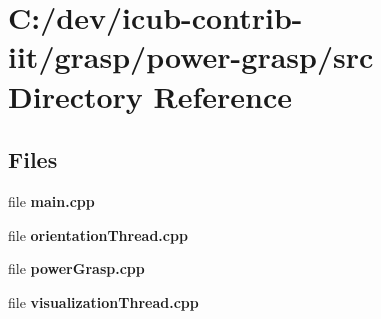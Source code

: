 \section{C\+:/dev/icub-\/contrib-\/iit/grasp/power-\/grasp/src Directory Reference}
\label{dir_cbbc0e5a003716b26669cba433d66af2}
\subsection*{Files}
\begin{DoxyCompactItemize}
\item 
file {\bfseries main.\+cpp}
\item 
file {\bfseries orientation\+Thread.\+cpp}
\item 
file {\bfseries power\+Grasp.\+cpp}
\item 
file {\bfseries visualization\+Thread.\+cpp}
\end{DoxyCompactItemize}
